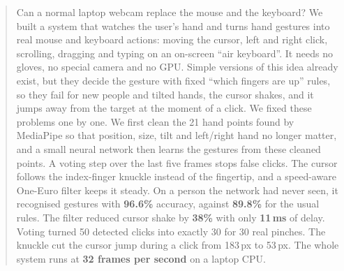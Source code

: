 \begin{abstract}
Can a normal laptop webcam replace the mouse and the keyboard? We built a
system that watches the user's hand and turns hand gestures into real mouse
and keyboard actions: moving the cursor, left and right click, scrolling,
dragging and typing on an on-screen ``air keyboard''. It needs no gloves, no
special camera and no GPU. Simple versions of this idea already exist, but
they decide the gesture with fixed ``which fingers are up'' rules, so they fail
for new people and tilted hands, the cursor shakes, and it jumps away from the
target at the moment of a click. We fixed these problems one by one. We
first clean the 21 hand points found by MediaPipe so that position, size,
tilt and left/right hand no longer matter, and a small neural network then
learns the gestures from these cleaned points. A voting step over the last
five frames stops false clicks. The cursor follows the index-finger knuckle
instead of the fingertip, and a speed-aware One-Euro filter keeps it steady.
On a person the network had never seen, it recognised gestures with
\textbf{96.6\%} accuracy, against \textbf{89.8\%} for the usual rules. The
filter reduced cursor shake by \textbf{38\%} with only \textbf{11\,ms} of
delay. Voting turned 50 detected clicks into exactly 30 for 30 real pinches.
The knuckle cut the cursor jump during a click from 183\,px to 53\,px. The
whole system runs at \textbf{32 frames per second} on a laptop CPU.
\end{abstract}
